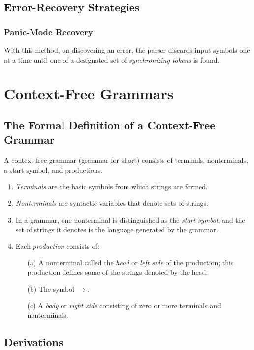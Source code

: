 \documentclass[12pt,a4paper,twoside,openany]{book}
\begin{document}
\subsection{Error-Recovery Strategies}
\subsubsection{Panic-Mode Recovery}

With this method, on discovering an error, the parser discards input symbols one at a time until one of a designated set of \textit{synchronizing tokens} is found.

\section{Context-Free Grammars}
\subsection{The Formal Definition of a Context-Free Grammar}

A context-free grammar (grammar for short) consists of terminals, nonterminals, a start symbol, and productions.
\begin{enumerate}
    \item\textit{Terminals} are the basic symbols from which strings are formed.
    \item\textit{Nonterminals} are syntactic variables that denote sets of strings.
    \item In a grammar, one nonterminal is distinguished as the \textit{start symbol}, and the set of strings it denotes is the language generated by the grammar.
    \item Each \textit{production} consists of:
    \begin{itemize}
        \item[(a)] A nonterminal called the \textit{head} or \textit{left side} of the production; this production defines some of the strings denoted by the head.
        \item[(b)] The symbol $\rightarrow$.
        \item[(c)] A \textit{body} or \textit{right side} consisting of zero or more terminals and nonterminals.
    \end{itemize}
\end{enumerate}

\subsection{Derivations}
\end{document}
